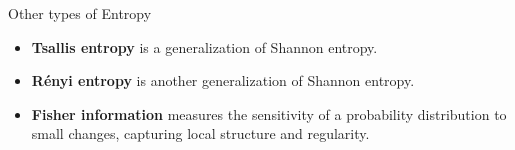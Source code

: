 \documentclass{beamer}
\begin{document}

\begin{frame}{Other types of Entropy}
	\begin{itemize}
		\item \textbf{Tsallis entropy} is a generalization of Shannon entropy.
		\item \textbf{Rényi entropy} is another generalization of Shannon entropy.
		\item \textbf{Fisher information} measures the sensitivity of a probability distribution to small changes, capturing local structure and regularity. 
	\end{itemize}
\end{frame}

\end{document}
